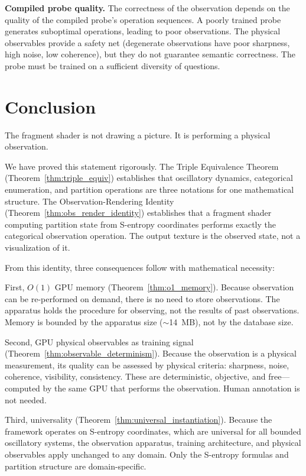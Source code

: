 \documentclass[11pt,twocolumn,a4paper]{article}
\theoremstyle{definition}
\theoremstyle{remark}
\begin{document}
\textbf{Compiled probe quality.} The correctness of the observation depends on the quality of the compiled probe's operation sequences. A poorly trained probe generates suboptimal operations, leading to poor observations. The physical observables provide a safety net (degenerate observations have poor sharpness, high noise, low coherence), but they do not guarantee semantic correctness. The probe must be trained on a sufficient diversity of questions.


\section{Conclusion}
\label{sec:conclusion}

The fragment shader is not drawing a picture. It is performing a physical observation.

We have proved this statement rigorously. The Triple Equivalence Theorem (Theorem~\ref{thm:triple_equiv}) establishes that oscillatory dynamics, categorical enumeration, and partition operations are three notations for one mathematical structure. The Observation-Rendering Identity (Theorem~\ref{thm:obs_render_identity}) establishes that a fragment shader computing partition state from S-entropy coordinates performs exactly the categorical observation operation. The output texture is the observed state, not a visualization of it.

From this identity, three consequences follow with mathematical necessity:

First, $O(1)$ GPU memory (Theorem~\ref{thm:o1_memory}). Because observation can be re-performed on demand, there is no need to store observations. The apparatus holds the procedure for observing, not the results of past observations. Memory is bounded by the apparatus size ($\sim$14~MB), not by the database size.

Second, GPU physical observables as training signal (Theorem~\ref{thm:observable_determinism}). Because the observation is a physical measurement, its quality can be assessed by physical criteria: sharpness, noise, coherence, visibility, consistency. These are deterministic, objective, and free---computed by the same GPU that performs the observation. Human annotation is not needed.

Third, universality (Theorem~\ref{thm:universal_instantiation}). Because the framework operates on S-entropy coordinates, which are universal for all bounded oscillatory systems, the observation apparatus, training architecture, and physical observables apply unchanged to any domain. Only the S-entropy formulas and partition structure are domain-specific.
\end{document}
